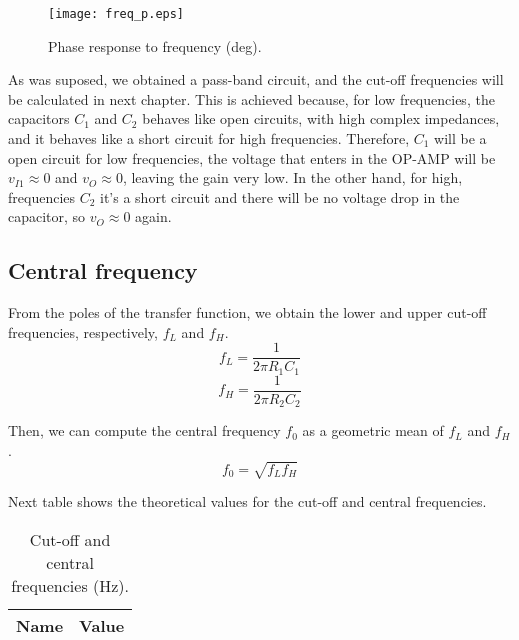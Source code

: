 \begin{figure}[H] \centering
\texttt{[image: freq\_p.eps]}
\caption{Phase response to frequency (deg).}
\label{fig:phase}
\end{figure}
 
 \par As was suposed, we obtained a pass-band circuit, and the cut-off frequencies will be calculated in next chapter. This is achieved because, for low frequencies, the capacitors $C_1$ and $C_2$ behaves like open circuits, with high complex impedances, and it behaves like a short circuit for high frequencies. Therefore, $C_1$ will be a open circuit for low frequencies, the voltage that enters in the OP-AMP will be $v_{I1}\approx 0$ and $v_{O}\approx 0$, leaving the gain very low. In the other hand, for high, frequencies $C_2$ it's a short circuit and there will be no voltage drop in the capacitor, so $v_O\approx 0$ again.
 
 \subsection{Central frequency}
 \par From the poles of the transfer function, we obtain the lower and upper cut-off frequencies, respectively, $f_L$ and $f_H$.
 \begin{equation}
 f_L=\frac{1}{2\pi R_1C_1}
 \end{equation}
 \begin{equation}
 f_H=\frac{1}{2\pi R_2C_2}
 \end{equation}
 \par Then, we can compute the central frequency $f_0$ as a geometric mean of $f_L$ and $f_H$.
 \begin{equation}
 f_0=\sqrt{f_Lf_H}
 \end{equation}
 
 \par Next table shows the theoretical values for the cut-off and central frequencies.
 \begin{table}[H]
    \centering
    \begin{tabular}{|l|r|}
    \hline    
    {\bf Name} & {\bf Value} \\ \hline
    
    \end{tabular}
     \caption{Cut-off and central frequencies (Hz).}
    \label{tab:freq}
  \end{table}

 
 
